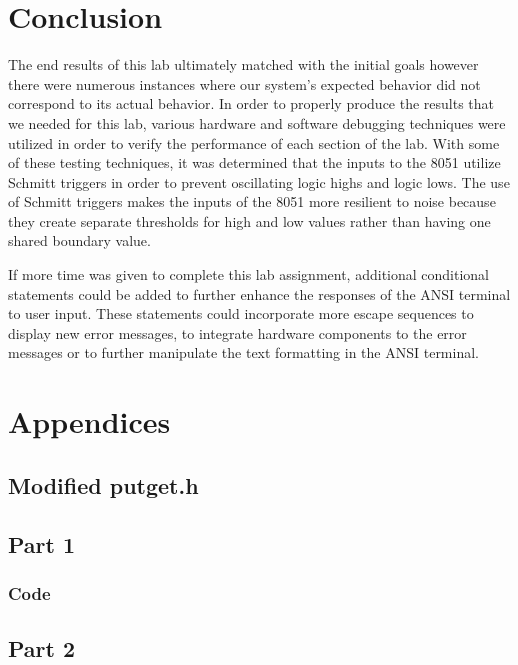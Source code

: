 \documentclass[12pt]{article}
\begin{document}
\section{Conclusion}

The end results of this lab ultimately matched with the initial goals however there were numerous instances where our system’s expected behavior did not correspond to its actual behavior. In order to properly produce the results that we needed for this lab, various hardware and software debugging techniques were utilized in order to verify the performance of each section of the lab. With some of these testing techniques, it was determined that the inputs to the 8051 utilize Schmitt triggers in order to prevent oscillating logic highs and logic lows. The use of Schmitt triggers makes the inputs of the 8051 more resilient to noise because they create separate thresholds for high and low values rather than having one shared boundary value. 

If more time was given to complete this lab assignment, additional conditional statements could be added to further enhance the responses of the ANSI terminal to user input. These statements could incorporate more escape sequences to display new error messages, to integrate hardware components to the error messages or to further manipulate the text formatting in the ANSI terminal. 



\section{Appendices}
\subsection{Modified putget.h}
	
\subsection{Part 1}
	\subsubsection{Code}
		
\subsection{Part 2}
\end{document}
